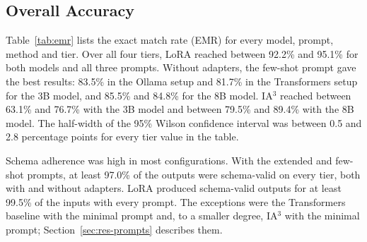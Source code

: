 \documentclass[journal,article,submit,pdftex,moreauthors]{Definitions/mdpi}
\begin{document}
\subsection{Overall Accuracy}\label{sec:res-overall}

Table~\ref{tab:emr} lists the exact match rate (EMR) for every model, prompt, method and tier. Over all four tiers, LoRA reached between 92.2\% and 95.1\% for both models and all three prompts. Without adapters, the few-shot prompt gave the best results: 83.5\% in the Ollama setup and 81.7\% in the Transformers setup for the 3B model, and 85.5\% and 84.8\% for the 8B model. IA$^3$ reached between 63.1\% and 76.7\% with the 3B model and between 79.5\% and 89.4\% with the 8B model. The half-width of the 95\% Wilson confidence interval was between 0.5 and 2.8 percentage points for every tier value in the table.

Schema adherence was high in most configurations. With the extended and few-shot prompts, at least 97.0\% of the outputs were schema-valid on every tier, both with and without adapters. LoRA produced schema-valid outputs for at least 99.5\% of the inputs with every prompt. The exceptions were the Transformers baseline with the minimal prompt and, to a smaller degree, IA$^3$ with the minimal prompt; Section~\ref{sec:res-prompts} describes them.
\end{document}
